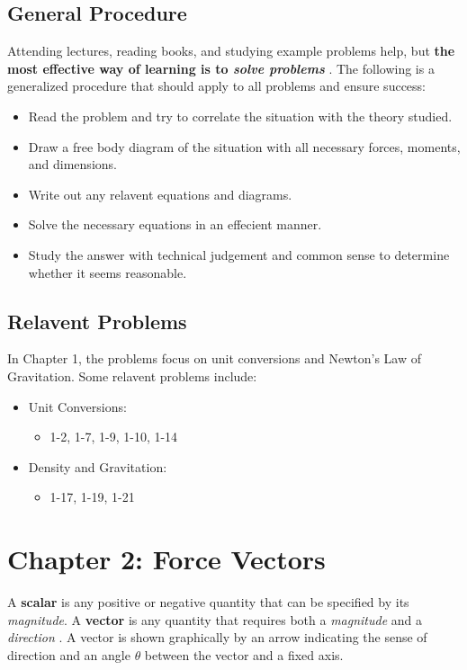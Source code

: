 \documentclass[12pt]{article}
\begin{document}
\subsection{General Procedure}
Attending lectures, reading books, and studying example problems help, but \textbf{the most effective way of learning is to \textit{solve problems}} \cite{hibbeler}.
The following is a generalized procedure that should apply to all problems and ensure success:
\begin{itemize}
    \item Read the problem and try to correlate the situation with the theory studied.
    \item Draw a free body diagram of the situation with all necessary forces, moments, and dimensions.
    \item Write out any relavent equations and diagrams.
    \item Solve the necessary equations in an effecient manner.
    \item Study the answer with technical judgement and common sense to determine whether it seems reasonable.
\end{itemize}

\subsection{Relavent Problems}
In Chapter 1, the problems focus on unit conversions and Newton's Law of Gravitation.
Some relavent problems include:
\begin{itemize}
    \item Unit Conversions:
    \begin{itemize}
        \item 1-2, 1-7, 1-9, 1-10, 1-14
    \end{itemize}
    \item Density and Gravitation:
    \begin{itemize}
        \item 1-17, 1-19, 1-21
    \end{itemize}
\end{itemize}

\pagebreak
\section{Chapter 2: Force Vectors}
A \textbf{scalar} is any positive or negative quantity that can be specified by its \textit{magnitude}.
A \textbf{vector} is any quantity that requires both a \textit{magnitude} and a \textit{direction} \cite{buckham}.
A vector is shown graphically by an arrow indicating the sense of direction and an angle $\theta$ between the vector and a fixed axis.
\end{document}
